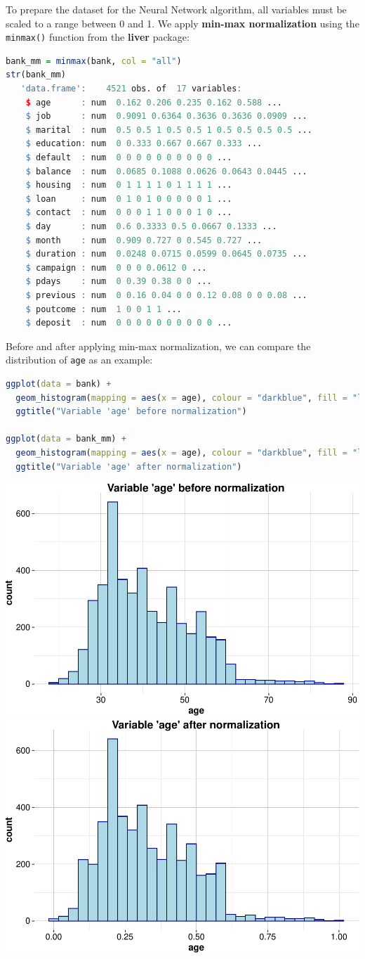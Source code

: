\documentclass[
]{book}
\newcommand{\passthrough}[1]{#1}
\theoremstyle{definition}
\theoremstyle{definition}
\theoremstyle{definition}
\theoremstyle{definition}
\theoremstyle{remark}
\begin{document}
To prepare the dataset for the Neural Network algorithm, all variables must be scaled to a range between 0 and 1. We apply \textbf{min-max normalization} using the \passthrough{\lstinline!minmax()!} function from the \textbf{liver} package:

\begin{lstlisting}[language=R]
bank_mm = minmax(bank, col = "all")
str(bank_mm)
   'data.frame':    4521 obs. of  17 variables:
    $ age      : num  0.162 0.206 0.235 0.162 0.588 ...
    $ job      : num  0.9091 0.6364 0.3636 0.3636 0.0909 ...
    $ marital  : num  0.5 0.5 1 0.5 0.5 1 0.5 0.5 0.5 0.5 ...
    $ education: num  0 0.333 0.667 0.667 0.333 ...
    $ default  : num  0 0 0 0 0 0 0 0 0 0 ...
    $ balance  : num  0.0685 0.1088 0.0626 0.0643 0.0445 ...
    $ housing  : num  0 1 1 1 1 0 1 1 1 1 ...
    $ loan     : num  0 1 0 1 0 0 0 0 0 1 ...
    $ contact  : num  0 0 0 1 1 0 0 0 1 0 ...
    $ day      : num  0.6 0.3333 0.5 0.0667 0.1333 ...
    $ month    : num  0.909 0.727 0 0.545 0.727 ...
    $ duration : num  0.0248 0.0715 0.0599 0.0645 0.0735 ...
    $ campaign : num  0 0 0 0.0612 0 ...
    $ pdays    : num  0 0.39 0.38 0 0 ...
    $ previous : num  0 0.16 0.04 0 0 0.12 0.08 0 0 0.08 ...
    $ poutcome : num  1 0 0 1 1 ...
    $ deposit  : num  0 0 0 0 0 0 0 0 0 0 ...
\end{lstlisting}

Before and after applying min-max normalization, we can compare the distribution of \passthrough{\lstinline!age!} as an example:

\begin{lstlisting}[language=R]
ggplot(data = bank) +
  geom_histogram(mapping = aes(x = age), colour = "darkblue", fill = "lightblue") +
  ggtitle("Variable 'age' before normalization")

ggplot(data = bank_mm) +
  geom_histogram(mapping = aes(x = age), colour = "darkblue", fill = "lightblue") +
  ggtitle("Variable 'age' after normalization")
\end{lstlisting}

\includegraphics[width=0.5\linewidth]{nn_files/figure-latex/unnamed-chunk-5-1} \includegraphics[width=0.5\linewidth]{nn_files/figure-latex/unnamed-chunk-5-2}
\end{document}
